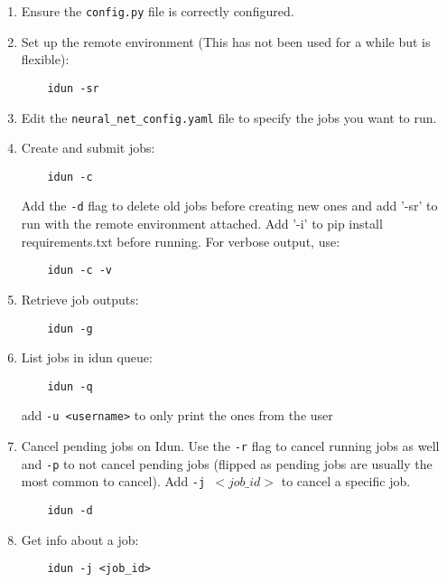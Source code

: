\begin{enumerate}
    \item Ensure the \texttt{config.py} file is correctly configured.
    \item Set up the remote environment (This has not been used for a while but is flexible):
    \begin{verbatim}
    idun -sr
    \end{verbatim}

    \item Edit the \texttt{neural\_net\_config.yaml} file to specify the jobs you want to run.

    \item Create and submit jobs:
    \begin{verbatim}
    idun -c
    \end{verbatim}
    Add the \texttt{-d} flag to delete old jobs before creating new ones and add '-sr' to run with the remote environment attached. Add '-i' to pip install requirements.txt before running. For verbose output, use:
    \begin{verbatim}
    idun -c -v
    \end{verbatim}

    \item Retrieve job outputs:
    \begin{verbatim}
    idun -g
    \end{verbatim}

    \item List jobs in idun queue:
    \begin{verbatim}
    idun -q
    \end{verbatim}
    add \texttt{-u <username>} to only print the ones from the user

    \item Cancel pending jobs on Idun. Use the \texttt{-r} flag to cancel running jobs as well and \texttt{-p} to not cancel pending jobs (flipped as pending jobs are usually the most common to cancel). Add \texttt{-j \(<job\_id>\)} to cancel a specific job.
    \begin{verbatim}
    idun -d
    \end{verbatim}
    

    \item Get info about a job:
    \begin{verbatim}
    idun -j <job_id>
    \end{verbatim}
    
\end{enumerate}

